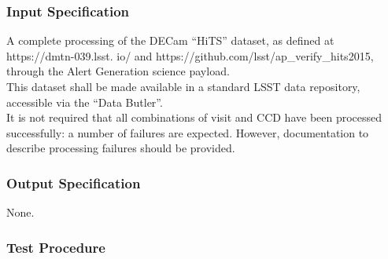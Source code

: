\subsubsection{Input Specification}

A complete processing of the DECam ``HiTS'' dataset, as defined at
https://dmtn-039.lsst. io/ and
https://github.com/lsst/ap\_verify\_hits2015, through the Alert
Generation science payload.\\
This dataset shall be made available in a standard LSST data repository,
accessible via the ``Data Butler''.\\
It is not required that all combinations of visit and CCD have been
processed successfully: a number of failures are expected. However,
documentation to describe processing failures should be provided.



\subsubsection{Output Specification}

None.



\subsubsection{Test Procedure}

